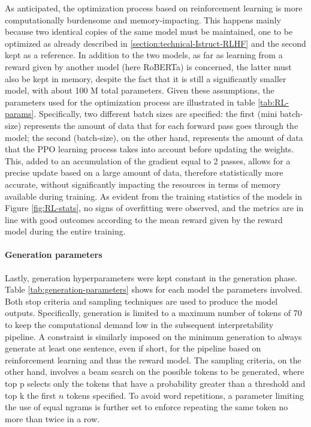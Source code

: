 As anticipated, the optimization process based on reinforcement learning is more computationally burdensome and memory-impacting. This happens mainly because two identical copies of the same model must be maintained, one to be optimized as already described in \ref{section:technical-Istruct-RLHF} and the second kept as a reference. In addition to the two models, as far as learning from a reward given by another model (here RoBERTa) is concerned, the latter must also be kept in memory, despite the fact that it is still a significantly smaller model, with about 100 M total parameters. Given these assumptions, the parameters used for the optimization process are illustrated in table \ref{tab:RL-params}. Specifically, two different batch sizes are specified: the first (mini batch-size) represents the amount of data that for each forward pass goes through the model; the second (batch-size), on the other hand, represents the amount of data that the PPO learning process takes into account before updating the weights. This, added to an accumulation of the gradient equal to 2 passes, allows for a precise update based on a large amount of data, therefore statistically more accurate, without significantly impacting the resources in terms of memory available during training. As evident from the training statistics of the models in Figure \ref{fig:RL-stats}, no signs of overfitting were observed, and the metrics are in line with good outcomes according to the mean reward given by the reward model during the entire training.

\paragraph{Generation parameters} Lastly, generation hyperparameters were kept constant in the generation phase. Table \ref{tab:generation-parameters} shows for each model the parameters involved. Both stop criteria and sampling techniques are used to produce the model outputs. Specifically, generation is limited to a maximum number of tokens of 70 to keep the computational demand low in the subsequent interpretability pipeline. A constraint is similarly imposed on the minimum generation to always generate at least one sentence, even if short, for the pipeline based on reinforcement learning and thus the reward model. The sampling criteria, on the other hand, involves a beam search on the possible tokens to be generated, where top p selects only the tokens that have a probability greater than a threshold and top k the first $n$ tokens specified. To avoid word repetitions, a parameter limiting the use of equal ngrams is further set to enforce repeating the same token no more than twice in a row.

